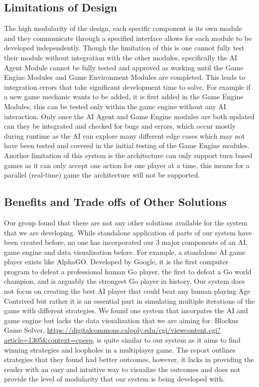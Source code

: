 \documentclass[12pt, titlepage]{article}
\begin{document}
\subsection*{Limitations of Design}
The high modularity of the design, each specific component is its own module and they communicate through a specified interface allows for each module to be developed independently. Though the limitation of this is one cannot fully test their module without integration with the other modules, specifically the AI Agent Module cannot be fully tested and approved as working until the Game Engine Modules and Game Environment Modules are completed. This leads to integration errors that take significant development time to solve. For example if a new game mechanic wants to be added, it is first added in the Game Engine Modules, this can be tested only within the game engine without any AI interaction. Only once the AI Agent and Game Engine modules are both updated can they be integrated and checked for bugs and errors, which occur mostly during runtime as the AI can explore many different edge cases which may not have been tested and covered in the initial testing of the Game Engine modules. 
Another limitation of this system is the architecture can only support turn based games as it can only accept one action for one player at a time, this means for a parallel (real-time) game the architecture will not be supported.

\subsection*{Benefits and Trade offs of Other Solutions}
Our group found that there are not any other solutions available for the system that we are developing. While standalone application of parts of our system have been created before, no one has incorporated our 3 major components of an AI, game engine and data visualization before. For example, a standalone AI game player exists like AlphaGO. Developed by Google, it is the first computer program to defeat a professional human Go player, the first to defeat a Go world champion, and is arguably the strongest Go player in history. Our system does not focus on creating the best AI player that could beat any human playing Age Contrived but rather it is an essential part in simulating multiple iterations of the game with different strategies. We found one system that incorpates the AI and game engine but lacks the data visualization that we are aiming for. Blockus Game Solver, \url{https://digitalcommons.calpoly.edu/cgi/viewcontent.cgi?article=1305&context=cpesp}, is quite similar to our system as it aims to find winning strategies and loopholes in a multiplayer game. The report outlines strategies that they found had better outcomes, however, it lacks in providing the reader with an easy and intuitive way to visualize the outcomes and does not provide the level of modularity that our system is being developed with.  
\end{document}

